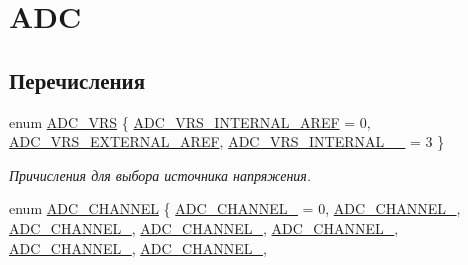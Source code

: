 \hypertarget{group___a_d_c}{}\section{A\+DC}
\label{group___a_d_c}
\subsection*{Перечисления}
\begin{DoxyCompactItemize}
\item 
enum \mbox{\hyperlink{group___a_d_c_ga5dad3282f36afa086c23dcd8914f5159}{A\+D\+C\+\_\+\+V\+RS}} \{ \mbox{\hyperlink{group___a_d_c_gga5dad3282f36afa086c23dcd8914f5159ac34494c51a3b587af36425a5a031973f}{A\+D\+C\+\_\+\+V\+R\+S\+\_\+\+I\+N\+T\+E\+R\+N\+A\+L\+\_\+\+A\+R\+EF}} = 0, 
\mbox{\hyperlink{group___a_d_c_gga5dad3282f36afa086c23dcd8914f5159ad26d7413322104ef9c98427005f39bd0}{A\+D\+C\+\_\+\+V\+R\+S\+\_\+\+E\+X\+T\+E\+R\+N\+A\+L\+\_\+\+A\+R\+EF}}, 
\mbox{\hyperlink{group___a_d_c_gga5dad3282f36afa086c23dcd8914f5159a0ffe49df24e833d35c6d94442f789f5e}{A\+D\+C\+\_\+\+V\+R\+S\+\_\+\+I\+N\+T\+E\+R\+N\+A\+L\+\_\+\_}} = 3
 \}
\begin{DoxyCompactList}\small\item\em Причисления для выбора источника напряжения. \end{DoxyCompactList}\item 
enum \mbox{\hyperlink{group___a_d_c_gaecdfe48b0bc36d2dd1f99274613a6c92}{A\+D\+C\+\_\+\+C\+H\+A\+N\+N\+EL}} \{ \newline
\mbox{\hyperlink{group___a_d_c_ggaecdfe48b0bc36d2dd1f99274613a6c92a69dddf5b6edfe54ac25b653d8f62d104}{A\+D\+C\+\_\+\+C\+H\+A\+N\+N\+E\+L\+\_}} = 0, 
\mbox{\hyperlink{group___a_d_c_ggaecdfe48b0bc36d2dd1f99274613a6c92a203b48944d019f4fda969a6fc2a9e492}{A\+D\+C\+\_\+\+C\+H\+A\+N\+N\+E\+L\+\_}}, 
\mbox{\hyperlink{group___a_d_c_ggaecdfe48b0bc36d2dd1f99274613a6c92ab5ff3c915ec02ae6ac3980a1312a4815}{A\+D\+C\+\_\+\+C\+H\+A\+N\+N\+E\+L\+\_}}, 
\mbox{\hyperlink{group___a_d_c_ggaecdfe48b0bc36d2dd1f99274613a6c92a6ca054f67bee5197eec92a0379cffb6e}{A\+D\+C\+\_\+\+C\+H\+A\+N\+N\+E\+L\+\_}}, 
\newline
\mbox{\hyperlink{group___a_d_c_ggaecdfe48b0bc36d2dd1f99274613a6c92a358c6f5e7243a7ed09640253d83d2131}{A\+D\+C\+\_\+\+C\+H\+A\+N\+N\+E\+L\+\_}}, 
\mbox{\hyperlink{group___a_d_c_ggaecdfe48b0bc36d2dd1f99274613a6c92add27743e52a0719102130818d31d545a}{A\+D\+C\+\_\+\+C\+H\+A\+N\+N\+E\+L\+\_}}, 
\mbox{\hyperlink{group___a_d_c_ggaecdfe48b0bc36d2dd1f99274613a6c92acf3be71bfeb9d342e6d845db91782b79}{A\+D\+C\+\_\+\+C\+H\+A\+N\+N\+E\+L\+\_}}, 

\end{DoxyCompactItemize}
